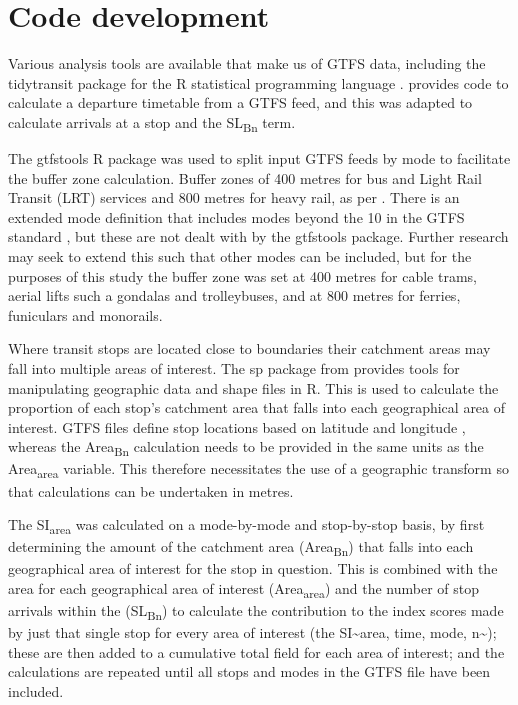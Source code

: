 \documentclass[]{tufte-book}
\begin{document}
\hypertarget{code-development}{%
\section{Code development}\label{code-development}}

Various analysis tools are available that make us of GTFS data,
including the tidytransit package \citep{tidytransit2023} for the R
statistical programming language \citep{R-base}.
\citet{tidytransit_departure_timetable} provides code to calculate a
departure timetable from a GTFS feed, and this was adapted to calculate
arrivals at a stop and the SL\textsubscript{Bn} term.

The gtfstools R package \citep{R-gtfstools} was used to split input GTFS
feeds by mode to facilitate the buffer zone calculation. Buffer zones of
400 metres for bus and Light Rail Transit (LRT) services and 800 metres
for heavy rail, as per \citet{currie2007identifying}. There is an
extended mode definition that includes modes beyond the 10 in the GTFS
standard \citep{filter_GTFS_by_mode}, but these are not dealt with by
the gtfstools package. Further research may seek to extend this such
that other modes can be included, but for the purposes of this study the
buffer zone was set at 400 metres for cable trams, aerial lifts such a
gondalas and trolleybuses, and at 800 metres for ferries, funiculars and
monorails.

Where transit stops are located close to boundaries their catchment
areas may fall into multiple areas of interest. The sp package from
\citep[\citet{applied_spatial_data_analysis_with_R}]{spatial_data_in_R}
provides tools for manipulating geographic data and shape files in R.
This is used to calculate the proportion of each stop's catchment area
that falls into each geographical area of interest. GTFS files define
stop locations based on latitude and longitude
\citep{GTFS_schedule_reference}, whereas the Area\textsubscript{Bn}
calculation needs to be provided in the same units as the
Area\textsubscript{area} variable. This therefore necessitates the use
of a geographic transform so that calculations can be undertaken in
metres.

The SI\textsubscript{area} was calculated on a mode-by-mode and
stop-by-stop basis, by first determining the amount of the catchment
area (Area\textsubscript{Bn}) that falls into each geographical area of
interest for the stop in question. This is combined with the area for
each geographical area of interest (Area\textsubscript{area}) and the
number of stop arrivals within the (SL\textsubscript{Bn}) to calculate
the contribution to the index scores made by just that single stop for
every area of interest (the SI\textasciitilde area, time, mode,
n\textasciitilde); these are then added to a cumulative total field for
each area of interest; and the calculations are repeated until all stops
and modes in the GTFS file have been included.
\end{document}

